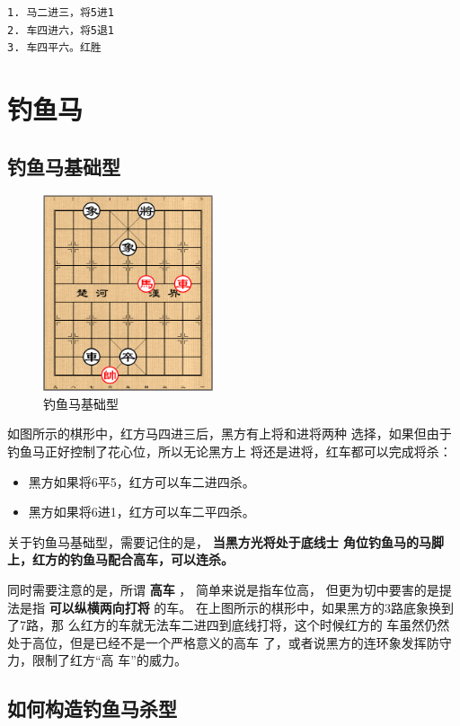\documentclass[a5paper,twoside]{book}
\begin{document}
\begin{verbatim}
1. 马二进三，将5进1
2. 车四进六，将5退1
3. 车四平六。红胜
\end{verbatim}


\chapter{钓鱼马}
\label{sec-3}

\section{钓鱼马基础型}
\label{sec-3-1}
\begin{figure}[H]
\centering
\includegraphics[width=5cm]{pic/钓鱼马-基础型.png}
\caption{钓鱼马基础型}
\end{figure}


如图所示的棋形中，红方马四进三后，黑方有上将和进将两种
选择，如果但由于钓鱼马正好控制了花心位，所以无论黑方上
将还是进将，红车都可以完成将杀：
\begin{itemize}
\item 黑方如果将6平5，红方可以车二进四杀。
\item 黑方如果将6进1，红方可以车二平四杀。
\end{itemize}


关于钓鱼马基础型，需要记住的是， \textbf{当黑方光将处于底线士
角位钓鱼马的马脚上，红方的钓鱼马配合高车，可以连杀。}

同时需要注意的是，所谓 \textbf{高车} ， 简单来说是指车位高，
但更为切中要害的是提法是指 \textbf{可以纵横两向打将} 的车。
在上图所示的棋形中，如果黑方的3路底象换到了7路，那
么红方的车就无法车二进四到底线打将，这个时候红方的
车虽然仍然处于高位，但是已经不是一个严格意义的高车
了，或者说黑方的连环象发挥防守力，限制了红方“高
车”的威力。

\section{如何构造钓鱼马杀型}
\label{sec-3-2}
\end{document}
